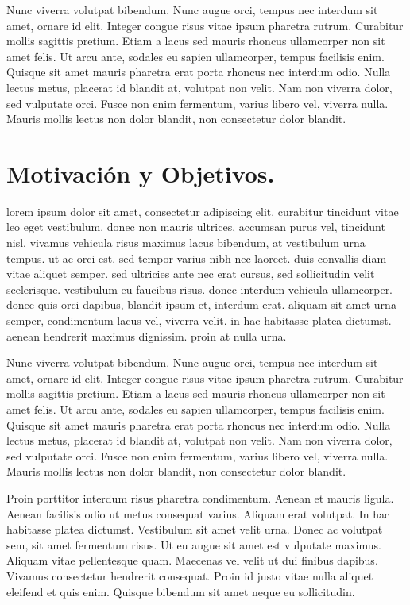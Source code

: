 Nunc viverra volutpat bibendum. Nunc augue orci, tempus nec interdum sit amet, ornare id elit. Integer congue risus vitae ipsum pharetra rutrum. Curabitur mollis sagittis pretium. Etiam a lacus sed mauris rhoncus ullamcorper non sit amet felis. Ut arcu ante, sodales eu sapien ullamcorper, tempus facilisis enim. Quisque sit amet mauris pharetra erat porta rhoncus nec interdum odio. Nulla lectus metus, placerat id blandit at, volutpat non velit. Nam non viverra dolor, sed vulputate orci. Fusce non enim fermentum, varius libero vel, viverra nulla. Mauris mollis lectus non dolor blandit, non consectetur dolor blandit.



\section*{Motivación y Objetivos.}

lorem ipsum dolor sit amet, consectetur adipiscing elit. curabitur tincidunt vitae leo eget vestibulum. donec non mauris ultrices, accumsan purus vel, tincidunt nisl. vivamus vehicula risus maximus lacus bibendum, at vestibulum urna tempus. ut ac orci est. sed tempor varius nibh nec laoreet. duis convallis diam vitae aliquet semper. sed ultricies ante nec erat cursus, sed sollicitudin velit scelerisque. vestibulum eu faucibus risus. donec interdum vehicula ullamcorper. donec quis orci dapibus, blandit ipsum et, interdum erat. aliquam sit amet urna semper, condimentum lacus vel, viverra velit. in hac habitasse platea dictumst. aenean hendrerit maximus dignissim. proin at nulla urna.

Nunc viverra volutpat bibendum. Nunc augue orci, tempus nec interdum sit amet, ornare id elit. Integer congue risus vitae ipsum pharetra rutrum. Curabitur mollis sagittis pretium. Etiam a lacus sed mauris rhoncus ullamcorper non sit amet felis. Ut arcu ante, sodales eu sapien ullamcorper, tempus facilisis enim. Quisque sit amet mauris pharetra erat porta rhoncus nec interdum odio. Nulla lectus metus, placerat id blandit at, volutpat non velit. Nam non viverra dolor, sed vulputate orci. Fusce non enim fermentum, varius libero vel, viverra nulla. Mauris mollis lectus non dolor blandit, non consectetur dolor blandit.

Proin porttitor interdum risus pharetra condimentum. Aenean et mauris ligula. Aenean facilisis odio ut metus consequat varius. Aliquam erat volutpat. In hac habitasse platea dictumst. Vestibulum sit amet velit urna. Donec ac volutpat sem, sit amet fermentum risus. Ut eu augue sit amet est vulputate maximus. Aliquam vitae pellentesque quam. Maecenas vel velit ut dui finibus dapibus. Vivamus consectetur hendrerit consequat. Proin id justo vitae nulla aliquet eleifend et quis enim. Quisque bibendum sit amet neque eu sollicitudin.




